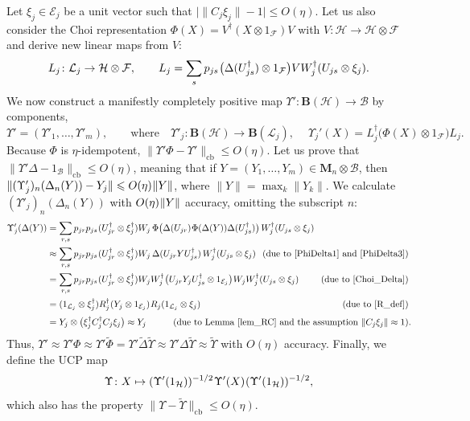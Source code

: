 \documentclass[12pt]{article}
\newcommand{\calB}{\mathcal{B}}
\newcommand{\calE}{\mathcal{E}}
\newcommand{\calF}{\mathcal{F}}
\newcommand{\calH}{\mathcal{H}}
\newcommand{\calL}{\mathcal{L}}
\newcommand{\ts}{\mkern1mu}
\newcommand{\cb}{\mathrm{cb}}
\newcommand{\Bo}{\mathbf{B}}
\newcommand{\wt}{\widetilde}
\newcommand*{\Ma}[1]{\mathbf{M}_{#1}}
\renewcommand{\le}{\leqslant}
\newtheorem[definition]{Definition}[Theorem]{Definition}
\newtheorem[remark]{Example}[Theorem]{Example}
\newtheorem[remark]{Remark}[Theorem]{Remark}
\newtheorem[remark]{Question}[Theorem]{Open question}
\newtheorem*[definition]{definition}{Definition}
\newtheorem*[remark]{example}{Example}
\newtheorem*[remark]{remark}{Remark}
\newtheorem*[remark]{question}{Open question}
\numberwithin{equation}{section}
\begin{document}
Let $\xi_j\in\calE_j$ be a unit vector such that $\bigl|\|C_j\xi_j\|-1\bigr|\le O(\eta)$. Let us also consider the Choi representation $\Phi(X)=V^\dag(X\otimes 1_\calF)V$ with $V\colon\calH\to\calH\otimes\calF$ and derive new linear maps from $V$:
\begin{equation}
L_j\colon\calL_j\to\calH\otimes\calF,\qquad
L_j=\sum_{s}p_{js}\ts\bigl(\Delta(U_{js}^\dag)\otimes 1_\calF\bigr)
V W_j^\dag(U_{js}\otimes\xi_j).
\end{equation}
We now construct a manifestly completely positive map $\Upsilon'\colon\Bo(\calH)\to\calB$ by components,
\begin{equation}
\Upsilon'=(\Upsilon'_1,\dots,\Upsilon'_m),\qquad \text{where}\quad
\Upsilon'_j\colon\Bo(\calH)\to\Bo(\calL_j),\quad\:
\Upsilon_j'(X)=L_j^\dag\bigl(\Phi(X)\otimes 1_\calF\bigr)L_j.
\end{equation}
Because $\Phi$ is $\eta$-idempotent, $\|\Upsilon'\Phi-\Upsilon'\|_\cb\le O(\eta)$. Let us prove that $\|\Upsilon'\Delta-1_\calB\|_\cb\le O(\eta)$, meaning that if $Y=(Y_1,\dots,Y_m)\in\Ma{n}\otimes\calB$, then $\|(\Upsilon'_j)_n(\Delta_n(Y))-Y_j\|\le O(\eta)\ts\|Y\|$, where $\|Y\|=\max_k\|Y_k\|$. We calculate $(\Upsilon'_j)_n(\Delta_n(Y))$ with $O(\eta)\ts\|Y\|$ accuracy, omitting the subscript $n$:
\[
\begin{alignedat}{2}
\Upsilon'_j(\Delta(Y))
&=\sum_{r,s}p_{jr}p_{js}\ts
(U_{jr}^\dag\otimes\xi_j^\dag)W_j\,
\Phi\bigl(\Delta(U_{jr})\ts\Phi(\Delta(Y))\Delta(U_{js}^\dag)\bigr)\,
W_j^\dag(U_{js}\otimes\xi_j)&&\\
&\approx \sum_{r,s}p_{jr}p_{js}\ts
(U_{jr}^\dag\otimes\xi_j^\dag)W_j\,\Delta(U_{jr}YU_{js}^\dag)\,
W_j^\dag(U_{js}\otimes\xi_j)&\hspace{-2cm}
(\text{due to \eqref{PhiDelta1} and \eqref{PhiDelta3}})&\\
&=\sum_{r,s}p_{jr}p_{js}\ts
(U_{jr}^\dag\otimes\xi_j^\dag)W_jW_j^\dag\ts
\bigl(U_{jr}Y_jU_{js}^\dag\otimes 1_{\calE_j}\bigr)\ts
W_jW_j^\dag(U_{js}\otimes\xi_j)\quad&
(\text{due to \eqref{Choi_Delta}})&\\
&=(1_{\calL_j}\otimes\xi_j^\dag)R_j^\dag\ts
(Y_j\otimes 1_{\calE_j})\ts R_j(1_{\calL_j}\otimes\xi_j)\quad&
(\text{due to \eqref{R_def}})&\\[2pt]
&=Y_j\otimes\bigl(\xi_j^{\dag}C_j^{\dag}C_j\xi_j\bigr)\approx Y_j&\hspace{-6cm}
(\text{due to Lemma~\ref{lem_RC} and the assumption $\|C_j\xi_j\|\approx 1$})&.
\end{alignedat}
\]
Thus, $\Upsilon'\approx \Upsilon'\Phi\approx \Upsilon'\wt{\Phi}= \Upsilon'\wt{\Delta}\wt{\Upsilon}\approx \Upsilon'\Delta\wt{\Upsilon}\approx \wt{\Upsilon}$ with $O(\eta)$ accuracy. Finally, we define the UCP map
\begin{equation}
\Upsilon\colon X\mapsto (\Upsilon'(1_\calH))^{-1/2}\ts\Upsilon'(X)\ts(\Upsilon'(1_\calH))^{-1/2},
\end{equation}
which also has the property $\|\Upsilon-\wt{\Upsilon}\|_\cb\le O(\eta)$.
\end{document}
